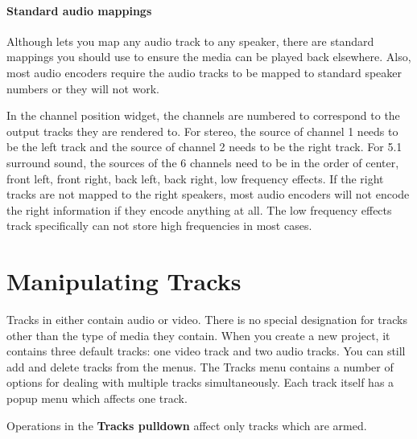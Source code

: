 \paragraph{Standard audio mappings} Although \CGG{} lets you map any
audio track to any speaker, there are standard mappings you should
use to ensure the media can be played back elsewhere. Also, most
audio encoders require the audio tracks to be mapped to standard
speaker numbers or they will not work.

In the channel position widget, the channels are numbered to
correspond to the output tracks they are rendered to. For stereo,
the source of channel 1 needs to be the left track and the source of
channel 2 needs to be the right track.  For 5.1 surround sound, the
sources of the 6 channels need to be in the order of center, front
left, front right, back left, back right, low frequency effects. If
the right tracks are not mapped to the right speakers, most audio
encoders will not encode the right information if they encode
anything at all. The low frequency effects track specifically can
not store high frequencies in most cases.


\section{Manipulating Tracks}%
\label{sec:manipulating_tracks}

Tracks in \CGG{} either contain audio or video.  There is no special
designation for tracks other than the type of media they contain.
When you create a new project, it contains three default tracks: one
video track and two audio tracks.  You can still add and delete
tracks from the menus.  The Tracks menu contains a number of options
for dealing with multiple tracks simultaneously.  Each track itself
has a popup menu which affects one track.

Operations in the \textbf{Tracks pulldown} affect only tracks which
are armed.

